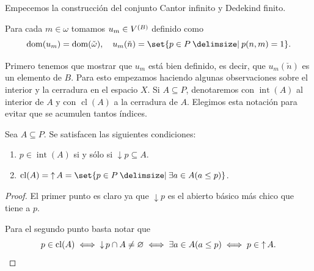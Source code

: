 \documentclass[letterpaper,DIV=15,12pt]{scrartcl}
\renewcommand{\emptyset}{\varnothing}
\DeclareMathOperator{\dom}{dom}                            %
\DeclareMathOperator{\arriba}{\uparrow}                    %
\DeclareMathOperator{\abajo}{\downarrow}                   %
\DeclareMathOperator{\inte}{int}                           %
\DeclareMathOperator{\cer}{cl}                             %
\newcommand{\st}{}
\newcommand{\SetSymbol}[1][]{%
\nonscript\:#1\vert
\allowbreak
\nonscript\:
\mathopen{}}
\renewcommand\st{\SetSymbol[\delimsize]}
\begin{document}
Empecemos la construcción del conjunto Cantor infinito y Dedekind finito.

\begin{definition}
    Para cada \(m\in\omega\) tomamos \(u_m\in\mb\) definido como
    \begin{equation*}
        \dom(u_m)=\dom(\check{\omega}), \quad
        u_m(\check{n})=\set{p\in P\st p(n,m)=1}.
    \end{equation*}
\end{definition}

Primero tenemos que mostrar que \(u_m\) está bien definido, es decir, que
\(u_m(\check{n})\) es un elemento de \(B\). Para esto empezamos haciendo algunas
observaciones sobre el interior y la cerradura en el espacio \(X\).
Si \(A\subseteq P\), denotaremos con \(\inte(A)\) al interior de
\(A\) y con \(\cer(A)\) a la cerradura de \(A\). Elegimos esta notación para
evitar que se acumulen tantos índices.

\begin{lemma}[label=lema:intercer]
    Sea \(A\subseteq P\). Se satisfacen las siguientes condiciones:
    \begin{enumerate}
        \item \(p\in\inte(A)\) si y sólo si \(\abajo p\subseteq A\).
        \item \(\cer(A)=\arriba A=\set{p\in P\st \exists a\in A(a\leq p)}\).
    \end{enumerate}
\end{lemma}
\begin{proof}
    El primer punto es claro ya que \(\abajo p\) es el abierto básico más chico
    que tiene a \(p\).

    Para el segundo punto basta notar que
    \begin{equation*}
        p\in\cer(A) \iff \abajo p\cap A\neq\emptyset \iff 
        \exists a\in A(a\leq p) \iff p\in\arriba A.
        \qedhere
    \end{equation*}
\end{proof}
\end{document}

